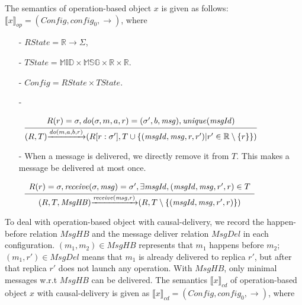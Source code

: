 The semantics of operation-based object $x$ is given as follows: $\llbracket x \rrbracket_{\mathit{op}} = (\mathit{Config},\mathit{config}_0,\rightarrow)$, where

\begin{itemize}
\setlength{\itemsep}{0.5pt}
\item[-] $\mathit{RState} = \mathbb{R} \rightarrow \Sigma$,

\item[-] $\mathit{TState} = \mathbb{MID} \times \mathbb{MSG} \times \mathbb{R} \times \mathbb{R}$.

\item[-] $\mathit{Config} = \mathit{RState} \times \mathit{TState}$.

\item[-]

$\begin{array}{l c}
   \bigfrac{
   \begin{array}{c}
     R(r) = \sigma, \mathit{do}(\sigma,m,a,r) = (\sigma',b,\mathit{msg}), \mathit{unique}(\mathit{msgId})
   \end{array}}
     {(R,T) {\xrightarrow{\mathit{do}(m,a,b,r)}} (R[r:\sigma'],T \cup \{ (\mathit{msgId},\mathit{msg},r,r') \vert r' \in \mathbb{R} \setminus \{ r \} \})}
\end{array}$

\item[-] When a message is delivered, we directly remove it from $T$. This makes a message be delivered at most once.

$\begin{array}{l c}
   \bigfrac{
   \begin{array}{c}
      R(r) = \sigma, \mathit{receive}(\sigma,\mathit{msg}) = \sigma', \exists \mathit{msgId},(\mathit{msgId},\mathit{msg},r',r) \in T
   \end{array}}
     {(R,T,\mathit{MsgHB}) {\xrightarrow{\mathit{receive}(\mathit{msg},r)}} (R,T \setminus \{ (\mathit{msgId},\mathit{msg},r',r) \} )}
\end{array}$
\end{itemize}

To deal with operation-based object with causal-delivery, we record the happen-before relation $\mathit{MsgHB}$ and the message deliver relation $\mathit{MsgDel}$ in each configuration. $(m_1,m_2) \in \mathit{MsgHB}$ represents that $m_1$ happens before $m_2$; $(m_1,r') \in \mathit{MsgDel}$ means that $m_1$ is already delivered to replica $r'$, but after that replica $r'$ does not launch any operation. With $\mathit{MsgHB}$, only minimal messages w.r.t $\mathit{MsgHB}$ can be delivered. The semantics $\llbracket x \rrbracket_{\mathit{cd}}$ of operation-based object $x$ with causal-delivery is given as $\llbracket x \rrbracket_{\mathit{cd}} = (\mathit{Config},\mathit{config}_0,\rightarrow)$, where

